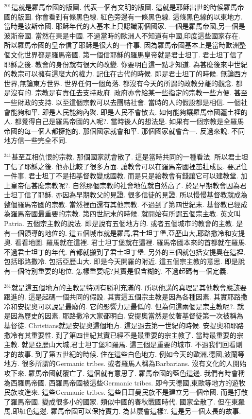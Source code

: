 \documentclass{book}
\begin{document}
$^{201}$這就是羅馬帝國的版圖.
代表一個有文明的版圖.
這就是耶穌出世的時候羅馬帝國的版圖.
你會看到有條黑色線.
紅色旁邊有一條黑色線.
這條黑色線的以東地方.
當時是波斯帝國.
耶穌年代的人基本上只認識兩個國家.
一個是羅馬帝國,另一個是波斯帝國.
當然在東是中國.
不過當時的歐洲人不知道有中國,印度這些國家存在.
所以羅馬帝國的皇帝信了耶穌是很大的一件事.
因為羅馬帝國基本上是當時歐洲整個文化世界都是羅馬帝國.
第一個信耶穌的羅馬皇帝就是君士坦丁.
君士坦丁信了耶穌之後.
教會的身份就有很大的改變.
你要明白這一點才知道.
為甚麼後來中世紀的教宗可以擁有這麼大的權力.
記住在古代的時候.
即是君士坦丁的時候.
無論西方世界,無論東方世界.
世界任何一個角落.
都沒有今天的所謂的政教分離的觀念.
都是沒有的.
宗教是有責任去支持政府.
政府亦會給某一些指定的宗教一些方便.
甚至一些財政的支持.
以至這個宗教可以去團結社會.
當時的人的假設都是相信.
一個社會能夠和平.
即是人民能夠內聚.
即是人民不會散去.
如何能夠讓羅馬帝國疆土裡的人.
都覺得自己是羅馬帝國的人呢?.
當時後人的想法是.
如果有一個宗教是全羅馬帝國的每一個人都擁抱的.
那個國家就會和平.
那個國家就會合一.
反過來說.
不同地方信一些完全不同.

$^{241}$甚至互相仇恨的宗教.
那個國家就會散了.
這是當時共同的一種看法.
所以君士坦丁信了耶穌之後.
他亦比較了很多方面.
讓教會可以在羅馬帝國裡茁壯成長.
要記住一件事.
君士坦丁不是把基督教變成國教.
而是只是給教會有錢讓它可以建教堂.
加上皇帝信甚麼宗教呢?.
自然那個宗教的社會地位就自然高了.
於是早期教會因為君士坦丁信了耶穌.
亦因為早期教父的見證.
很多信徒的見證.
所以慢慢基督教就成為整個羅馬帝國的宗教.
當然裡面還有其他宗教.
不過到了第四世紀末.
基督教已經成為羅馬帝國最重要的宗教.
第四世紀末的時候.
就開始有所謂五個宗主教.
英文叫Patria.
五個宗主教的說法.
即是說有五個地方的.
或者五個城市的教會的主教.
是有一個領導的地位的.
這五個城市就是羅馬,君士坦丁堡,亞歷山大,耶路撒冷和安提奧.
看看地圖.
羅馬就在這裡.
君士坦丁堡就在這裡.
羅馬帝國本來的首都就在羅馬.
不過君士坦丁的年代.
首都就搬到了君士坦丁堡.
另外的三個就包括安提奧在這裡.
包括耶路撒冷.
包括亞歷山大.
即是今天開羅的附近.
這五個宗主教的意思.
即是說有一個特別重要的地位.
怎樣重要呢?其實是很含糊的.
不過起碼有一個定義.

$^{281}$就是這五個地方的主教是特別有勝利充滿的.
所以他講的真理是其他教會應該要跟進的.
這是起碼一個共同的假設.
其實這五個宗主教是因為各種因素.
其實耶路撒冷和安提奧可以說是最廢的.
它的影響力是最低的.
但為何這兩個是宗主教呢?.
就是因為歷史的因素.
耶路撒冷大家都明白.
安提奧當然是仗著基督徒第一次被稱為基督徒.
Christians就是安提奧這個地方.
這是過去第一世紀的時候.
安提奧和耶路撒冷有其重要性.
到了第四世紀其實已經不是最重要的宗主教了.
當時最重要的宗主教.
就是亞歷山大城,君士坦丁堡和羅馬.
這三個是重要的城市.
不過我們回看剛才的故事.
到了第五世紀的時候.
住在這些白色地方.
例如今天的歐洲,德國,波蘭等地方.
很多所謂的Germanic tribes.
或者羅馬人稱為Barbarians.
沒有文化的人開始攻下來.
羅馬帝國就覆亡了.
這個就有意思了.
羅馬帝國的藍色這邊.
我們有時會稱為西羅馬帝國.
西羅馬帝國被這些Germanic tribes.
即今天德國,東歐等地方的遊牧民族攻進來.
這些Germanic tribes.
這些日耳曼民族不是建立另一個帝國.
而是打散了羅馬帝國.
變成很多小的國家.
類似中國的春秋戰國時代.
國家全散了.
但在東羅馬,即紅色這邊.
羅馬帝國可以保持實力.
為甚麼會這樣?.
這是另一個太長的故事.
\end{document}
